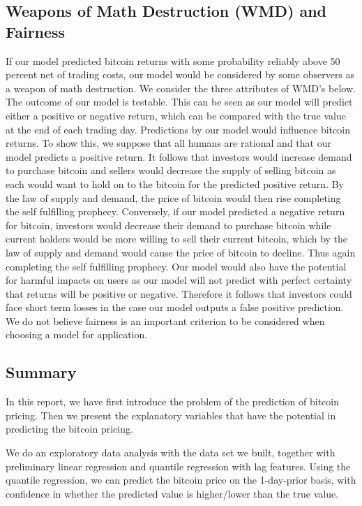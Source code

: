 \documentclass[9pt,twocolumn,twoside]{ilcss}
\begin{document}
\subsection*{Weapons of Math Destruction (WMD) and Fairness}
If our model predicted bitcoin returns with some probability reliably above 50 percent net of trading costs, our model would be considered by some observers as a weapon of math destruction.  We consider the three attributes of WMD's below.
The outcome of our model is testable. This can be seen as our model will predict either a positive or negative return, which can be compared with the true value at the end of each trading day.
Predictions by our model would influence bitcoin returns. To show this, we suppose that all humans are rational and that our model predicts a positive return. It follows that investors would increase demand to purchase bitcoin and sellers would decrease the supply of selling bitcoin as each would want to hold on to the bitcoin for the predicted positive return. By the law of supply and demand, the price of bitcoin would then rise completing the self fulfilling prophecy. Conversely, if our model predicted a negative return for bitcoin, investors would decrease their demand to purchase bitcoin while current holders would be more willing to sell their current bitcoin, which by the law of supply and demand would cause the price of bitcoin to decline. Thus again completing the self fulfilling prophecy.
Our model would also have the potential for harmful impacts on users as our model will not predict with perfect certainty that returns will be positive or negative. Therefore it follows that investors could face short term losses in the case our model outputs a false positive prediction.
We do not believe fairness is an important criterion to be considered when choosing a model for application.

\subsection*{Summary}
In this report, we have first introduce the problem of the prediction of bitcoin pricing. Then we present the explanatory variables that have the potential in predicting the bitcoin pricing.

We do an exploratory data analysis with the data set we built, together with preliminary linear regression and quantile regression with lag features. Using the quantile regression, we can predict the bitcoin price on the 1-day-prior basis, with confidence in whether the predicted value is higher/lower than the true value. 
\end{document}
